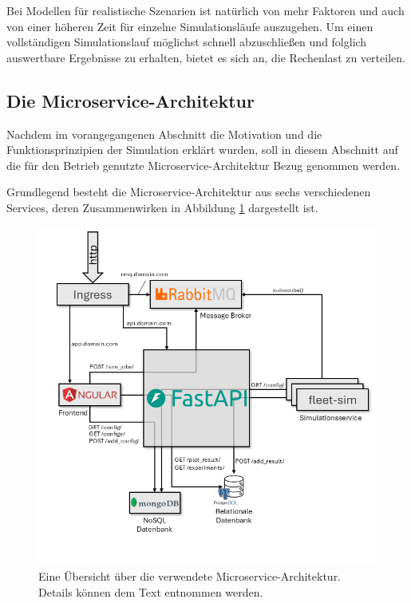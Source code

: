 \documentclass[11pt,a4paper]{article}
\begin{document}
Bei Modellen für realistische Szenarien ist natürlich von mehr Faktoren und auch von einer höheren Zeit 
für einzelne Simulationsläufe auszugehen. Um einen vollständigen Simulationslauf möglichst schnell abzuschließen
und folglich auswertbare Ergebnisse zu erhalten, bietet es sich an, die Rechenlast zu verteilen.  

\subsection{Die Microservice-Architektur}
Nachdem im vorangegangenen Abschnitt die Motivation und die Funktionsprinzipien der Simulation erklärt wurden,
soll in diesem Abschnitt auf die für den Betrieb genutzte Microservice-Architektur Bezug genommen werden.


Grundlegend besteht die Microservice-Architektur aus sechs verschiedenen Services, deren Zusammenwirken
in Abbildung \ref{fig:microservice-architektur} dargestellt ist.

\begin{figure}
	\label{fig:microservice-architektur}
	\centering
	\includegraphics[width=\textwidth]{media/Microservice-Architektur.png}
	\caption{
		Eine Übersicht über die verwendete Microservice-Architektur.
		Details können dem Text entnommen werden.
	}
\end{figure}
\end{document}

